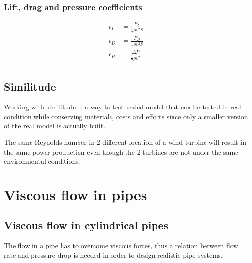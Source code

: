 \documentclass[10pt, twocolumn]{article}
\begin{document}
\subsubsection{Lift, drag and pressure coefficients}
\begin{align*}
  c_L & = \frac{F_L}{\frac{1}{2} \rho v^2 S}    \\
  c_D & = \frac{F_D}{\frac{1}{2} \rho v^2 S}    \\
  c_P & = \frac{\Delta P}{\frac{1}{2} \rho v^2} \\
\end{align*}


\subsection{Similitude}
Working with similitude is a way to test scaled model that can be tested in real condition while conserving materials, costs and efforts since only a smaller version of the real model is actually built.

\begin{example}
  The same Reynolds number in 2 different location of a wind turbine will result in the same power production even though the 2 turbines are not under the same environmental conditions.
\end{example}


\section{Viscous flow in pipes}
\subsection{Viscous flow in cylindrical pipes}
The flow in a pipe has to overcome viscous forces, thus a relation between flow rate and pressure drop is needed in order to design realistic pipe systems.
\end{document}
